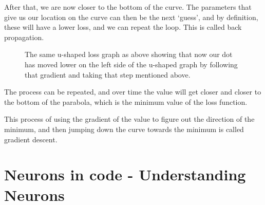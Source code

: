 After that, we are now closer to the bottom of the curve. The parameters that give us our location on the curve can then be the next ‘guess’, and by definition, these will have a lower loss, and we can repeat the loop. This is called back propagation.

\begin{figure}
    \caption{The same u-shaped loss graph as above showing that now our dot has moved lower on the left side of the u-shaped graph by following that gradient and taking that step mentioned above.}
\end{figure}  



The process can be repeated, and over time the value will get closer and closer to the bottom of the parabola, which is the minimum value of the loss function.

This process of using the gradient of the value to figure out the direction of the minimum, and then jumping down the curve towards the minimum is called gradient descent.


\section{Neurons in code - Understanding Neurons}

